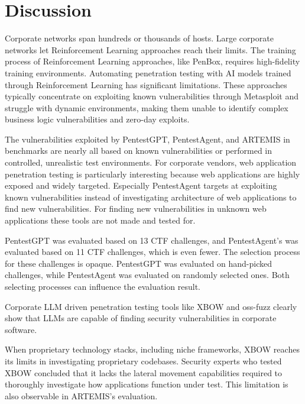 \chapter{Discussion}
\label{ch:chapter06}

Corporate networks span hundreds or thousands of hosts. Large corporate networks let Reinforcement Learning approaches reach their limits. The training process of Reinforcement Learning approaches, like PenBox, requires high-fidelity training environments. \cite{Schwartz_2019} 
Automating penetration testing with \ac{AI} models trained through Reinforcement Learning has significant limitations. These approaches typically concentrate on exploiting known vulnerabilities through Metasploit and struggle with dynamic environments, making them unable to identify complex business logic vulnerabilities and zero-day exploits.

The vulnerabilities exploited by PentestGPT, PentestAgent, and ARTEMIS in benchmarks are nearly all based on known vulnerabilities or performed in controlled, unrealistic test environments. For corporate vendors, web application penetration testing is particularly interesting because web applications are highly exposed and widely targeted. Especially PentestAgent targets at exploiting known vulnerabilities instead of investigating architecture of web applications to find new vulnerabilities. For finding new vulnerabilities in unknown web applications these tools are not made and tested for.

PentestGPT was evaluated based on 13 \ac{CTF} challenges, and PentestAgent's was evaluated based on 11 \ac{CTF} challenges, which is even fewer. The selection process for these challenges is opaque. PentestGPT was evaluated on hand-picked challenges, while PentestAgent was evaluated on randomly selected ones. Both selecting processes can influence the evaluation result.

Corporate \ac{LLM} driven penetration testing tools like XBOW and oss-fuzz clearly show that \ac{LLM}s are capable of finding security vulnerabilities in corporate software.

When proprietary technology stacks, including niche frameworks, XBOW reaches its limits in investigating proprietary codebases. Security experts who tested XBOW concluded that it lacks the lateral movement capabilities required to thoroughly investigate how applications function under test. This limitation is also observable in ARTEMIS's evaluation.


